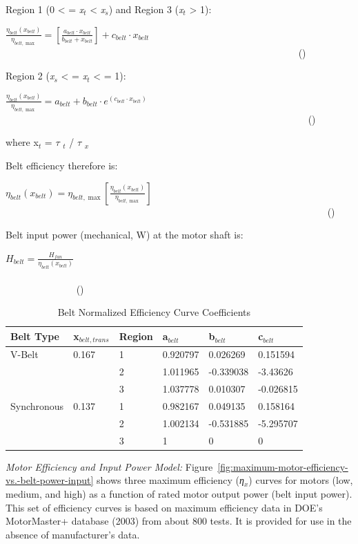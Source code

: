 Region 1 (0 \textless{} = \emph{x\(_{t}\)} \textless{} \emph{x\(_{s}\)}) and Region 3 (\emph{x\(_{t}\)} \textgreater{} 1):

\(\frac{{{\eta_{belt}}({x_{belt}})}}{{{\eta_{belt,\max }}}} = \left[ {\frac{{{a_{belt}} \cdot {x_{belt}}}}{{{b_{belt}} + {x_{belt}}}}} \right] + {c_{belt}} \cdot {x_{belt}}\) ~~~~~~~~~~~~~~~~~~~~~~~~~~~~~~~~~~~~~~~~~~~~~~~~~~~~~~~~~~~~ ()

Region 2 (\emph{x\(_{s}\)} \textless{} = \emph{x\(_{t}\)} \textless{} = 1):

\(\frac{{{\eta_{belt}}({x_{belt}})}}{{{\eta_{belt,\max }}}} = {a_{belt}} + {b_{belt}} \cdot {e^{\left( {{c_{belt}} \cdot {x_{belt}}} \right)}}\) ~~~~~~~~~~~~~~~~~~~~~~~~~~~~~~~~~~~~~~~~~~~~~~~~~~~~~~~~~~~~~~ ()

where x\(_{t}\) = \(\tau\) \(_{t}\) / \(\tau\) \(_{x}\)

Belt efficiency therefore is:

\({\eta_{belt}}({x_{belt}}) = {\eta_{belt,\max }}\left[ {\frac{{{\eta_{belt}}({x_{belt}})}}{{{\eta_{belt,\max }}}}} \right]\) ~~~~~~~~~~~~~~~~~~~~~~~~~~~~~~~~~~~~~~~~~~~~~~~~~~~~~~~~~~~~~~~~~~ ()

Belt input power (mechanical, W) at the motor shaft is:

\({H_{belt}} = \frac{{{H_{fan}}}}{{{\eta_{belt}}({x_{belt}})}}\) ~~~~~~~~~~~~~~~~~~~~~~~~~~~~~~~~~~~~~~~~~~~~~~~~~~~~~~~~~~~~~~~~~~~~~~~~~~~~~~~~~~~~~~ ()

\begin{longtable}[l]{@{}llllll@{}}
\caption{Belt Normalized Efficiency Curve Coefficients \protect \label{table:belt-normalized-efficiency-curve-coefficients}}\\
\toprule 
Belt Type & x\(_{belt,trans}\) & Region & a\(_{belt}\) & b\(_{belt}\) & c\(_{belt}\) \tabularnewline \midrule
\endhead
V-Belt & 0.167 & 1 & 0.920797 & 0.026269 & 0.151594 \tabularnewline
 & & 2 & 1.011965 & -0.339038 & -3.43626 \tabularnewline
 & & 3 & 1.037778 & 0.010307 & -0.026815 \tabularnewline
Synchronous & 0.137 & 1 & 0.982167 & 0.049135 & 0.158164 \tabularnewline
 & & 2 & 1.002134 & -0.531885 & -5.295707 \tabularnewline
 & & 3 & 1 & 0 & 0 \tabularnewline
\bottomrule
\end{longtable}

\emph{Motor Efficiency and Input Power Model:} Figure~\ref{fig:maximum-motor-efficiency-vs.-belt-power-input} shows three maximum efficiency (\emph{η\(_{x}\)}) curves for motors (low, medium, and high) as a function of rated motor output power (belt input power). This set of efficiency curves is based on maximum efficiency data in DOE's MotorMaster+ database (2003) from about 800 tests. It is provided for use in the absence of manufacturer's data.

